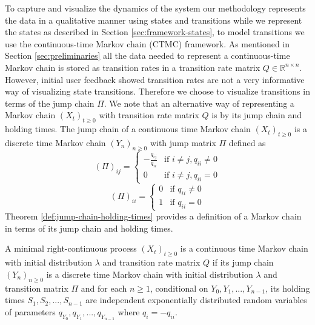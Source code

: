 To capture and visualize the dynamics of the system our methodology represents the data in a qualitative manner
using states and transitions while we represent the states as described in Section \ref{sec:framework-states},
to model transitions we use the continuous-time Markov chain (CTMC) framework.
As mentioned in Section \ref{sec:preliminaries} all the data needed to represent a continuous-time Markov chain
is stored as transition rates in a transition rate matrix $Q \in \mathbb{R}^{n \times n}$. However, initial user
feedback showed transition rates are not a very informative way of visualizing state transitions. Therefore
we choose to visualize transitions in terms of the jump chain $\Pi$.
We note that an alternative way of representing a Markov chain $(X_t)_{t \ge 0}$ with transition rate matrix $Q$
is by its jump chain and holding times. The jump chain of a continuous time Markov chain $(X_t)_{t \ge 0}$ is
a discrete time Markov chain $(Y_n)_{n \ge 0}$ with jump matrix $\Pi$ defined as
\begin{equation}
	\nonumber
	\left(\Pi\right)_{ij} = 
		\left\{
			\begin{array}{ll}
				-\frac{q_{ij}}{q_{ii}} & \mbox{if } i \ne j, q_{ii} \ne 0 \\
				0 & \mbox{if } i \ne j, q_{ii} = 0
			\end{array}
		\right.
\end{equation}
\begin{equation}
	\nonumber
	\left(\Pi\right)_{ii} = 
		\left\{
			\begin{array}{ll}
				0 & \mbox{if } q_{ii} \ne 0 \\
				1 & \mbox{if } q_{ii} = 0
			\end{array}
		\right.
\end{equation}
Theorem \ref{def:jump-chain-holding-times} provides a definition of a Markov chain in terms of its jump chain and holding times.

\begin{defn}
	\label{def:jump-chain-holding-times}
	A minimal right-continuous process $(X_t)_{t \ge 0}$ is a continuous time Markov chain with initial
	distribution $\lambda$ and transition rate matrix $Q$ if its jump chain $(Y_n)_{n \ge 0}$ is a 
	discrete time Markov chain with initial distribution $\lambda$ and transition matrix $\Pi$ and
	for each $n \ge 1$, conditional on $Y_0, Y_1, ..., Y_{n-1}$, its holding times $S_1, S_2, ..., S_{n-1}$
	are independent exponentially distributed random variables of parameters $q_{Y_0}, q_{Y_1}, ..., q_{Y_{n-1}}$
	where $q_i = -q_{ii}$.
\end{defn}

